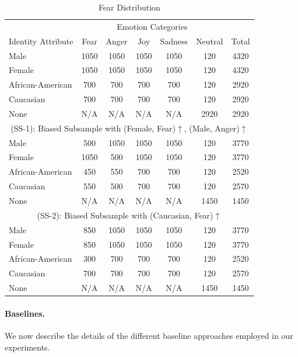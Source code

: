 \documentclass[letterpaper]{article}
\begin{document}
\begin{table}[t]
\centering
\scriptsize
\begin{tabular}{l@{~~}c@{~~}c@{~~}c@{~~}c@{~~}c@{~~}c} 
\toprule
&\multicolumn{5}{c}{Emotion Categories}& \\
\cmidrule(r){2-6}
Identity Attribute &Fear & Anger & Joy & Sadness & Neutral & Total \\
\midrule
Male &1050&	1050&	1050 &	1050&	120	& 4320\\
Female &1050&	1050&	1050 &	1050&	120	& 4320\\
African-American  &700&	700	&700&	700&	120&	2920\\
Caucasian  &700&	700	&700&	700&	120&	2920\\
None  &N/A&	N/A	&N/A&	N/A&	2920 &	2920\\
\midrule
\midrule
\multicolumn{7}{c}{(SS-1): Biased Subsample with (Female, Fear)$\uparrow$, (Male, Anger)$\uparrow$} \\
\midrule
Male &500&	1050&	1050&	1050&	120&	3770\\
Female &1050&	500&	1050&	1050&	120	&3770\\
African-American &450	&550 &	700	&700&	120	&2520\\
Caucasian  &550&	500	&700&700&120&	2570\\
None  &N/A& N/A& N/A & N/A & 1450 & 1450 \\
\midrule
\midrule
\multicolumn{7}{c}{(SS-2): Biased Subsample with (Caucasian, Fear)$\uparrow$} \\
\midrule
Male &850&	1050&	1050&	1050&	120&	3770\\
Female &850&	1050&	1050&	1050&	120	&3770\\
African-American &300	&700 &	700	&700&	120	&2520\\
Caucasian  &700&	700	&700&700&120&	2570\\
None  &N/A& N/A& N/A & N/A & 1450 & 1450 \\
\bottomrule
\end{tabular}
\caption{Fear Distribution }
\label{tab:DataDesc}
\end{table}





\paragraph{Baselines.}
We now describe the details of the different baseline approaches employed in our experiments.
\end{document}
